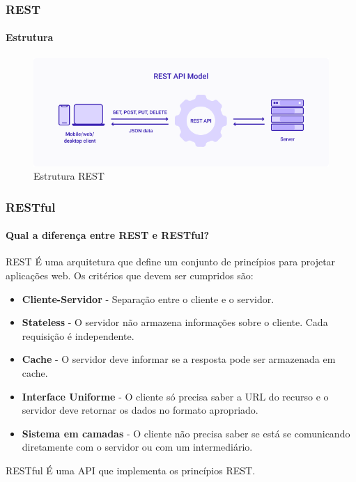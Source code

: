 \documentclass[
	10pt, %
	t, %
]{beamer}
\begin{document}
\begin{frame}
	\frametitle{REST}
	\framesubtitle{Estrutura}

	\begin{figure}
		\includegraphics[width=0.9\linewidth]{rest_estrutura.png}
		\caption{Estrutura REST}
		\label{fig:rest_structure}
	\end{figure}

\end{frame}

\begin{frame}
	\frametitle{RESTful}
	\framesubtitle{Qual a diferença entre REST e RESTful?}

	\begin{block}{REST}
		É uma \alert{arquitetura} que define um conjunto de princípios para projetar aplicações web.
		Os critérios que devem ser cumpridos são:
		\begin{itemize}
			\item \textbf{Cliente-Servidor} - Separação entre o cliente e o servidor.
			\item \textbf{Stateless} - O servidor não armazena informações sobre o cliente. Cada requisição é independente.
			\item \textbf{Cache} - O servidor deve informar se a resposta pode ser armazenada em cache.
			\item \textbf{Interface Uniforme} - O cliente só precisa saber a URL do recurso e o servidor deve retornar os dados no formato apropriado.
			\item \textbf{Sistema em camadas} - O cliente não precisa saber se está se comunicando diretamente com o servidor ou com um intermediário.
		\end{itemize}
	
	\end{block}

	\begin{block}{RESTful}
		É uma API que \alert{implementa os princípios REST}.
	\end{block}
	
	
\end{frame}
\end{document}
